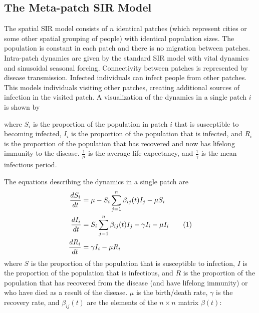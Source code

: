 \documentclass[twocolumn,nofootinbib,showkeys,twoside,floatfix,unsortedaddress,flushbottom,10pt,aps,pra]{report}
\newcommand\numberthis{\addtocounter{equation}{1}\tag{\theequation}}
\begin{document}
\subsection{The Meta-patch SIR Model} 
\indent
The spatial SIR model consists of $n$ identical patches (which represent cities or some other spatial grouping of people) with identical population sizes. The population is constant in each patch and there is no migration between patches. Intra-patch dynamics are given by the standard SIR model with vital dynamics and sinusoidal seasonal forcing. Connectivity between patches is represented by disease transmission. Infected individuals can infect people from other patches. This models individuals visiting other patches, creating additional sources of infection in the visited patch. 
A visualization of the dynamics in a single patch $i$ is shown by
\begin{center}
\end{center}
\qquad
where $S_i$ is the proportion of the population in patch $i$ that is susceptible to becoming infected, $I_i$ is the proportion of the population that is infected, and $R_i$ is the proportion of the population that has recovered and now has lifelong immunity to the disease. $\frac{1}{\mu}$ is the average life expectancy, and $\frac{1}{\gamma}$ is the mean infectious period.
\par
 \smallskip \qquad
The equations describing the dynamics in a single patch are
\begin{align*}
  \frac{dS_i}{dt} &= \mu - S_i\sum\limits_{j=1}^{n}\beta_{ij}(t) I_j -\mu S_i \\ 
  \frac{dI_i}{dt} &= S_i\sum\limits_{j=1}^{n}\beta_{ij}(t) I_j -\gamma I_i - \mu I_i  \numberthis \label{model} \\
  \frac{dR_i}{dt} &= \gamma I_i -\mu R_i      
\end{align*}
where $S$ is the proportion of the population that is susceptible to infection, $I$ is the proportion of the population that is infectious, and $R$ is the proportion of the population that has recovered from the disease (and have lifelong immunity) or who have died as a result of the disease. $\mu$ is the birth/death rate, $\gamma$ is the recovery rate, and $\beta_{ij}(t)$ are the elements of the $n\times n$ matrix $\beta(t)$:
\end{document}
